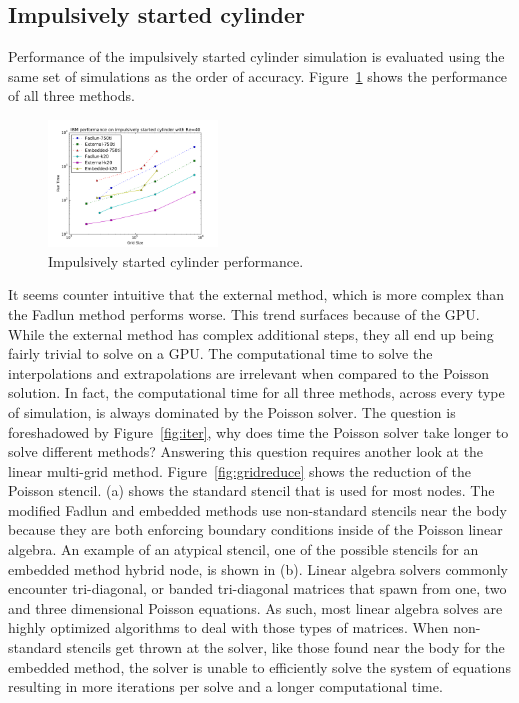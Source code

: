 \documentclass[onehalf,11pt]{beavtex}
\begin{document}
\subsection{Impulsively started cylinder}

Performance of the impulsively started cylinder simulation is evaluated using the same set of simulations as the order of accuracy. 
Figure~\ref{fig:cyperf} shows the performance of all three methods.
\begin{figure}[!htb]
	\centering
	\includegraphics[width=0.4\textwidth]{cylinder_performance}
	\caption{Impulsively started cylinder performance.}
	\label{fig:cyperf}
\end{figure}
It seems counter intuitive that the external method, which is more complex than the Fadlun method performs worse. 
This trend surfaces because of the GPU.
While the external method has complex additional steps, they all end up being fairly trivial to solve on a GPU. 
The computational time to solve the interpolations and extrapolations are irrelevant when compared to the Poisson solution. 
In fact, the computational time for all three methods, across every type of simulation, is always dominated by the Poisson solver. 
The question is foreshadowed by Figure~\ref{fig:iter}, why does time the Poisson solver take longer to solve different methods?
Answering this question requires another look at the linear multi-grid method. 
Figure~\ref{fig:gridreduce} shows the reduction of the Poisson stencil. 
(a) shows the standard stencil that is used for most nodes. 
The modified Fadlun and embedded methods use non-standard stencils near the body because they are both enforcing boundary conditions inside of the Poisson linear algebra. 
An example of an atypical stencil, one of the possible stencils for an embedded method hybrid node, is shown in (b). 
Linear algebra solvers commonly encounter tri-diagonal, or banded tri-diagonal
matrices that spawn from one, two and three dimensional Poisson equations.
As such, most linear algebra solves are highly optimized algorithms to deal with those types of matrices. 
When non-standard stencils get thrown at the solver, like those found near the body for the embedded method, the solver is unable to efficiently solve the system of equations resulting in more iterations per solve and a longer computational time. 
\end{document}
